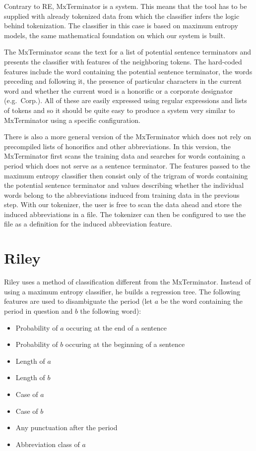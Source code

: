 Contrary to RE, MxTerminator \cite{sbd-mxterm} is a  system. This means that the tool has to be supplied with
already tokenized data from which the classifier infers the logic behind
tokenization. The classifier in this case is based on maximum entropy models,
the same mathematical foundation on which our system is built.

The MxTerminator scans the text for a list of potential sentence terminators
and presents the classifier with features of the neighboring tokens. The
hard-coded features include the word containing the potential sentence
terminator, the words preceding and following it, the presence of particular
characters in the current word and whether the current word is a honorific or a
corporate designator (e.g.\ Corp.). All of these are easily expressed using
regular expressions and lists of tokens and so it should be quite easy to
produce a system very similar to MxTerminator using a specific configuration.

There is also a more general version of the MxTerminator which does not rely on
precompiled lists of honorifics and other abbreviations. In this version, the
MxTerminator first scans the training data and searches for words containing a
period which does not serve as a sentence terminator. The features passed to
the maximum entropy classifier then consist only of the trigram of words
containing the potential sentence terminator and values describing whether the
individual words belong to the abbreviations induced from training data in the
previous step. With our tokenizer, the user is free to scan the data ahead and
store the induced abbreviations in a file. The tokenizer can then be configured
to use the file as a definition for the induced abbreviation feature.

\section{Riley}
\label{sec:survey-riley}

Riley \cite{sbd-riley} uses a method of classification different from the
MxTerminator. Instead of using a maximum entropy classifier, he builds a
regression tree. The following features are used to disambiguate the period
(let $a$ be the word containing the period in question and $b$ the following
word):

\begin{itemize}
  \item Probability of $a$ occuring at the end of a sentence
  \item Probability of $b$ occuring at the beginning of a sentence
  \item Length of $a$
  \item Length of $b$
  \item Case of $a$
  \item Case of $b$
  \item Any punctuation after the period
  \item Abbreviation class of $a$
\end{itemize}


